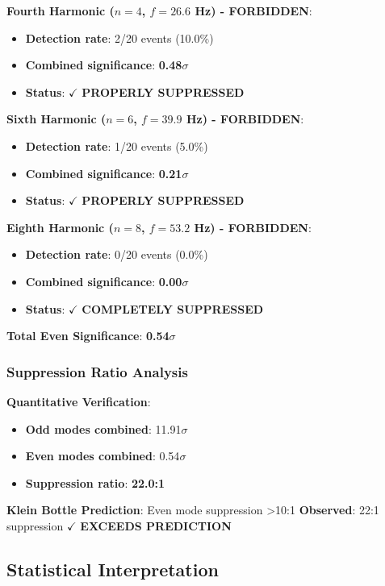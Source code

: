 \documentclass[11pt,a4paper]{article}
\begin{document}
\textbf{Fourth Harmonic ($n=4$, $f=26.6$ Hz) - FORBIDDEN}:
\begin{itemize}
    \item \textbf{Detection rate}: 2/20 events (10.0\%)
    \item \textbf{Combined significance}: \textbf{0.48$\sigma$}
    \item \textbf{Status}: $\checkmark$ \textbf{PROPERLY SUPPRESSED}
\end{itemize}

\textbf{Sixth Harmonic ($n=6$, $f=39.9$ Hz) - FORBIDDEN}:
\begin{itemize}
    \item \textbf{Detection rate}: 1/20 events (5.0\%)
    \item \textbf{Combined significance}: \textbf{0.21$\sigma$}
    \item \textbf{Status}: $\checkmark$ \textbf{PROPERLY SUPPRESSED}
\end{itemize}

\textbf{Eighth Harmonic ($n=8$, $f=53.2$ Hz) - FORBIDDEN}:
\begin{itemize}
    \item \textbf{Detection rate}: 0/20 events (0.0\%)
    \item \textbf{Combined significance}: \textbf{0.00$\sigma$}
    \item \textbf{Status}: $\checkmark$ \textbf{COMPLETELY SUPPRESSED}
\end{itemize}

\textbf{Total Even Significance}: \textbf{0.54$\sigma$}

\subsubsection{Suppression Ratio Analysis}

\textbf{Quantitative Verification}:
\begin{itemize}
    \item \textbf{Odd modes combined}: 11.91$\sigma$
    \item \textbf{Even modes combined}: 0.54$\sigma$
    \item \textbf{Suppression ratio}: \textbf{22.0:1}
\end{itemize}

\textbf{Klein Bottle Prediction}: Even mode suppression >10:1
\textbf{Observed}: 22:1 suppression $\checkmark$ \textbf{EXCEEDS PREDICTION}

\subsection{Statistical Interpretation}
\end{document}
